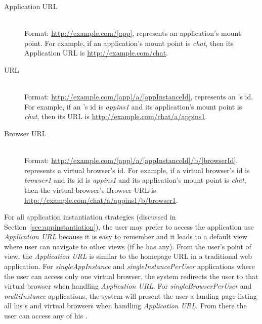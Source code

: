 \begin{description}

\item[Application URL] \label{itm:appurl} \hfill \\
Format: \url{http://example.com/[app]}, \code{[app]} represents an
application's mount point.   For example, if an application's mount point is
\emph{chat},  then its Application URL is \url{http://example.com/chat}.


\item[\appins{} URL] \label{itm:appinsurl} \hfill \\
Format: \url{http://example.com/[app]/a/[appInstanceId]},
\code{[appInstanceId]} represents an \appins{}'s id.  For example, if an
\appins{}'s id is \emph{appins1} and its application's mount point is
\emph{chat}, then its \appins{} URL is
\url{http://example.com/chat/a/appins1}.


\item[Browser URL] \label{itm:vburl} \hfill \\
Format: \url{http://example.com/[app]/a/[appInstanceId]/b/[browserId]},
\code{[browserId]} represents a virtual browser's id. For example, if a
virtual browser's id is \emph{browser1} and its \appins{} id is 
 \emph{appins1} and its application's mount point is \emph{chat},
  then the virtual browser's
Browser URL is \url{http://example.com/chat/a/appins1/b/browser1}.

\end{description}

For all application instantiation strategies (discussed in
Section~\ref{sec:appinstantiation}), 
the user may prefer to access the application use 
\emph{Application URL}
because it is easy to remember and
it leads to a default view where user can navigate to other views (if he has any).
From the user's point of view,
the \emph{Application URL} is similar to the homepage URL in a traditional web application.
For \emph{singleAppInstance}   and \emph{singleInstancePerUser}
applications where the user can access only one   virtual browser, the system
redirects the user to that virtual browser when handling \emph{Application
URL}. 
For \emph{singleBrowserPerUser} and \emph{multiInstance} applications, the
system will present the user a landing page listing all his \appins{}s and
virtual browsers when handling \emph{Application URL}. From there the user can
access any of his \appins{}.

